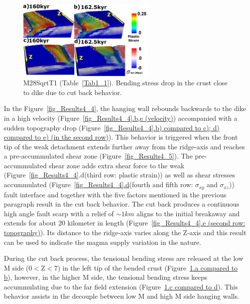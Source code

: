 \begin{figure}[h]
  \centering
    \includegraphics[width=0.6\textwidth]{./Figures/fig_Results4_6_sqrt_cut_back_bending_drop.eps}
  \caption{M28SqrtT1 (Table~\hyperref[Tab1_1]{\ref{Tab1_1}}). Bending stress drop in the crust close to dike due to cut back behavior.}
 \label{fig_Results4_6}
\end{figure}

In the Figure~\hyperref[fig_Results4_4]{\ref{fig_Results4_4}}, the hanging wall rebounds backwards to the dike in a high velocity (Figure~\hyperref[fig_Results4_4]{\ref{fig_Results4_4}.b,e (velocity)}) accompanied with a sudden topography drop (Figure~\hyperref[fig_Results4_4]{\ref{fig_Results4_4}.b) compared to c); d) compared to e) (in the second row)}). This behavior is triggered when the front tip of the weak detachment extends further away from the ridge-axis and reaches a pre-accummulated shear zone (Figure~\hyperref[fig_Results4_5]{\ref{fig_Results4_5}}). The pre-accummulated shear zone adds extra shear force to the weak (Figure~\hyperref[fig_Results4_4]{\ref{fig_Results4_4}}.d(third row: plastic strain)) as well as shear stresses accummulated (Figure~\hyperref[fig_Results4_4]{\ref{fig_Results4_4}.d}(fourth and fifth row: $\sigma_{xy}$ and $\sigma_{xz}$)) fault interface and together with the five factors mentioned in the previous paragraph result in the cut back behavior. The cut back produces a continuous high angle fault scarp with a relief of $\sim 1km$ aligns to the initial breakaway and extends for about 20 kilometer in length (Figure~\hyperref[fig_Results4_4]{\ref{fig_Results4_4}.e (second row: topography)}). Its distance to the ridge-axis varies along the Z-axis and this result can be used to indicate the magma supply variation in the nature. 

During the cut back process, the tensional bending stress are released at the low M side ($0<$Z$<7$) in the left tip of the bended crust (Figure~\hyperref[fig_Results4_6]{\ref{fig_Results4_6}.a compared to b}), however, in the higher M side, the tensional bending stress keeps accummulating due to the far field extension (Figure~\hyperref[fig_Results4_6]{\ref{fig_Results4_6}.c compared to d}). This behavior assists in the decouple between low M and high M side hanging walls. 

